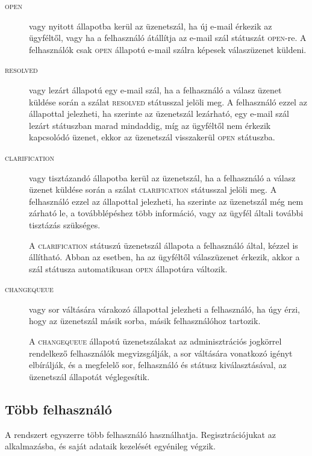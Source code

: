 \begin{description}
	\item[\textsc{open}] vagy nyitott állapotba kerül az üzenetszál, ha új e-mail érkezik az ügyféltől, vagy ha a felhasználó átállítja az e-mail szál státuszát \textsc{open}-re. A felhasználók csak \textsc{open} állapotú e-mail szálra képesek válaszüzenet küldeni.
	
	\item[\textsc{resolved}] vagy lezárt állapotú egy e-mail szál, ha a felhasználó a válasz üzenet küldése során a szálat \textsc{resolved} státusszal jelöli meg. A felhasználó ezzel az állapottal jelezheti, ha szerinte az üzenetszál lezárható, egy e-mail szál lezárt státuszban marad mindaddig, míg az ügyféltől nem érkezik kapcsolódó üzenet, ekkor az üzenetszál visszakerül \textsc{open} státuszba.
	
	\item[\textsc{clarification}] vagy tisztázandó állapotba kerül az üzenetszál, ha a felhasználó a válasz üzenet küldése során a szálat \textsc{clarification} státusszal jelöli meg. A felhasználó ezzel az állapottal jelezheti, ha szerinte az üzenetszál még nem zárható le, a továbblépéshez több információ, vagy az ügyfél általi további tisztázás szükséges.
	
	A \textsc{clarification} státuszú üzenetszál állapota a felhasználó által, kézzel is állítható. Abban az esetben, ha az ügyféltől válaszüzenet érkezik, akkor a szál státusza automatikusan \textsc{open} állapotúra változik.
	
	\item[\textsc{change\textunderscore queue}] vagy sor váltására várakozó állapottal jelezheti a felhasználó, ha úgy érzi, hogy az üzenetszál másik sorba, másik felhasználóhoz tartozik. 
	
	A \textsc{change\textunderscore queue} állapotú üzenetszálakat az adminisztrációs jogkörrel rendelkező felhasználók megvizsgálják, a sor váltására vonatkozó igényt elbírálják, és a megfelelő sor, felhasználó és státusz kiválasztásával, az üzenetszál állapotát véglegesítik.
	
\end{description}




\subsection{Több felhasználó}\label{sec:tobb_felhasznalo}
A rendszert egyszerre több felhasználó használhatja. Regisztrációjukat az alkalmazásba, és saját adataik kezelését egyénileg végzik.

